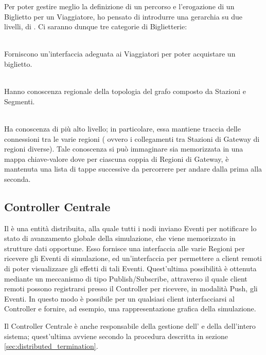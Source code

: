 	Per poter gestire meglio la definizione di un percorso e l'erogazione di un Biglietto per un Viaggiatore, ho pensato di introdurre una gerarchia su due livelli, di . Ci saranno dunque tre categorie di Biglietterie:
		\begin{description}
			\item {} \\
			Forniscono un'interfaccia adeguata ai Viaggiatori per poter acquistare un biglietto.
			\item {}\\
			Hanno conoscenza regionale della topologia del grafo composto da Stazioni e Segmenti.
			\item {} \\ 
			Ha conoscenza di più alto livello; in particolare, essa mantiene traccia delle connessioni tra le varie regioni ( ovvero i collegamenti tra Stazioni di Gateway di regioni diverse). Tale conoscenza si può immaginare sia memorizzata in una mappa chiave-valore  dove per ciascuna coppia di Regioni di Gateway, è mantenuta una lista di tappe successive  da percorrere per andare dalla prima alla seconda.
		\end{description} 
	
	\subsection{Controller Centrale}
		
	Il  è una entità distribuita, alla quale tutti i nodi inviano Eventi per notificare lo stato di avanzamento globale della simulazione, che viene memorizzato in strutture dati opportune. Esso fornisce una interfaccia alle varie Regioni per ricevere gli Eventi di simulazione, ed un'interfaccia per permettere a client remoti di poter visualizzare gli effetti di tali Eventi. Quest'ultima possibilità è ottenuta mediante un meccanismo di tipo Publish/Subscribe, attraverso il quale client remoti possono registrarsi presso il Controller per ricevere, in modalità Push, gli Eventi.
	In questo modo è possibile per un qualsiasi client interfacciarsi al Controller e fornire, ad esempio, una rappresentazione grafica della simulazione.

	Il Controller Centrale è anche responsabile della gestione dell' e della  dell'intero sistema; quest'ultima avviene secondo la procedura descritta in sezione \ref{sec:distributed_termination}.
\newpage
